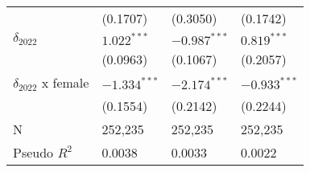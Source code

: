 \begin{tabular}{llll}
                           &           (0.1707) &           (0.3050) &           (0.1742) \\
$\delta_{2022}$            &      $1.022^{***}$ &     $-0.987^{***}$ &      $0.819^{***}$ \\
                           &           (0.0963) &           (0.1067) &           (0.2057) \\
$\delta_{2022}$ x female   &     $-1.334^{***}$ &     $-2.174^{***}$ &     $-0.933^{***}$ \\
                           &           (0.1554) &           (0.2142) &           (0.2244) \\
N                          &            252,235 &            252,235 &            252,235 \\
Pseudo $R^2$               &             0.0038 &             0.0033 &             0.0022 \\
\bottomrule
\end{tabular}
